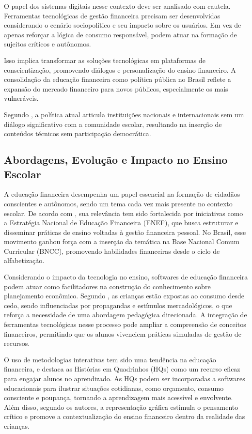 \documentclass[
	article,			%
	12pt,				%
	oneside,			%
	a4paper,			%
	english,			%
	brazil,				%
	sumario=tradicional
	]{abntex2}
\begin{document}
    O papel dos sistemas digitais nesse contexto deve ser analisado com cautela. Ferramentas tecnológicas de gestão financeira precisam ser desenvolvidas considerando o cenário sociopolítico e seu impacto sobre os usuários. Em vez de apenas reforçar a lógica de consumo responsável, podem atuar na formação de sujeitos críticos e autônomos.

    Isso implica transformar as soluções tecnológicas em plataformas de conscientização, promovendo diálogos e personalização do ensino financeiro. A consolidação da educação financeira como política pública no Brasil reflete a expansão do mercado financeiro para novos públicos, especialmente os mais vulneráveis.

    Segundo , a política atual articula instituições nacionais e internacionais sem um diálogo significativo com a comunidade escolar, resultando na inserção de conteúdos técnicos sem participação democrática.

\subsection{Abordagens, Evolução e Impacto no Ensino Escolar}

    A educação financeira desempenha um papel essencial na formação de cidadãos conscientes e autônomos, sendo um tema cada vez mais presente no contexto escolar. De acordo com , sua relevância tem sido fortalecida por iniciativas como a Estratégia Nacional de Educação Financeira (ENEF), que busca estruturar e disseminar práticas de ensino voltadas à gestão financeira pessoal. No Brasil, esse movimento ganhou força com a inserção da temática na Base Nacional Comum Curricular (BNCC), promovendo habilidades financeiras desde o ciclo de alfabetização.

    Considerando o impacto da tecnologia no ensino, softwares de educação financeira podem atuar como facilitadores na construção do conhecimento sobre planejamento econômico. Segundo , as crianças estão expostas ao consumo desde cedo, sendo influenciadas por propagandas e estímulos mercadológicos, o que reforça a necessidade de uma abordagem pedagógica direcionada. A integração de ferramentas tecnológicas nesse processo pode ampliar a compreensão de conceitos financeiros, permitindo que os alunos vivenciem práticas simuladas de gestão de recursos.

    O uso de metodologias interativas tem sido uma tendência na educação financeira, e  destaca as Histórias em Quadrinhos (HQs) como um recurso eficaz para engajar alunos no aprendizado. As HQs podem ser incorporadas a softwares educacionais para ilustrar situações cotidianas, como orçamento, consumo consciente e poupança, tornando a aprendizagem mais acessível e envolvente. Além disso, segundo os autores, a representação gráfica estimula o pensamento crítico e promove a contextualização do ensino financeiro dentro da realidade das crianças.
\end{document}
